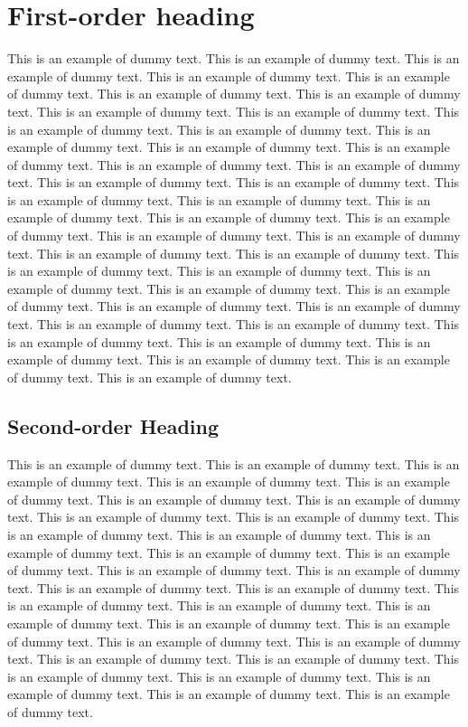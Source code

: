 \documentclass[lineno]{jfm}
\begin{document}
\section{First-order heading}
\label{sec:headings}

 This is an example of dummy text. This is an example of dummy text. This is an example of dummy text. This is an example of dummy text. This is an example of dummy text. This is an example of dummy text. This is an example of dummy text. This is an example of dummy text. This is an example of dummy text. This is an example of dummy text. This is an example of dummy text. This is an example of dummy text. This is an example of dummy text. This is an example of dummy text. This is an example of dummy text. This is an example of dummy text. This is an example of dummy text. This is an example of dummy text. This is an example of dummy text. This is an example of dummy text. This is an example of dummy text. This is an example of dummy text. This is an example of dummy text. This is an example of dummy text. This is an example of dummy text. This is an example of dummy text. This is an example of dummy text. This is an example of dummy text. This is an example of dummy text. This is an example of dummy text. This is an example of dummy text. This is an example of dummy text. This is an example of dummy text. This is an example of dummy text. This is an example of dummy text. This is an example of dummy text. This is an example of dummy text. This is an example of dummy text. This is an example of dummy text. This is an example of dummy text. This is an example of dummy text. This is an example of dummy text.

\subsection {Second-order Heading}
 This is an example of dummy text. This is an example of dummy text. This is an example of dummy text. This is an example of dummy text. This is an example of dummy text. This is an example of dummy text. This is an example of dummy text. This is an example of dummy text. This is an example of dummy text. This is an example of dummy text. This is an example of dummy text. This is an example of dummy text.  This is an example of dummy text. This is an example of dummy text. This is an example of dummy text. This is an example of dummy text. This is an example of dummy text. This is an example of dummy text. This is an example of dummy text. This is an example of dummy text. This is an example of dummy text. This is an example of dummy text. This is an example of dummy text. This is an example of dummy text. This is an example of dummy text. This is an example of dummy text. This is an example of dummy text. This is an example of dummy text. This is an example of dummy text. This is an example of dummy text. This is an example of dummy text. This is an example of dummy text.
\end{document}
